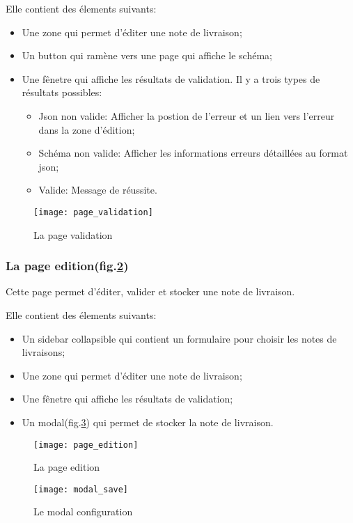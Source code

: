 Elle contient des élements suivants:
\begin{itemize}
 \item Une zone qui permet d'éditer une note de livraison;
 \item Un button qui ramène vers une page qui affiche le schéma;
 \item Une fênetre qui affiche les résultats de validation. Il y a trois types de résultats possibles:
       \begin{itemize}
        \item Json non valide: Afficher la postion de l'erreur et un lien vers l'erreur dans la zone d'édition;
        \item Schéma non valide: Afficher les informations erreurs détaillées au format json;
        \item Valide: Message de réussite.
       \end{itemize}
\end{itemize}

\begin{figure}[ht]
 \centering
 \texttt{[image: page\_validation]}
 \caption{La page validation}
 \label{fig:page_validation}
\end{figure}

\subsubsection{La page edition(fig.\ref{fig:page_edition})}
Cette page permet d'éditer, valider et stocker une note de livraison.

Elle contient des élements suivants:
\begin{itemize}
 \item Un sidebar collapsible qui contient un formulaire pour choisir les notes de livraisons;
 \item Une zone qui permet d'éditer une note de livraison;
 \item Une fênetre qui affiche les résultats de validation;
 \item Un modal(fig.\ref{fig:modal_save}) qui permet de stocker la note de livraison.
\end{itemize}

\begin{figure}[ht]
 \centering
 \texttt{[image: page\_edition]}
 \caption{La page edition}
 \label{fig:page_edition}
\end{figure}

\begin{figure}[ht]
 \centering
 \texttt{[image: modal\_save]}
 \caption{Le modal configuration}
 \label{fig:modal_save}
\end{figure}

